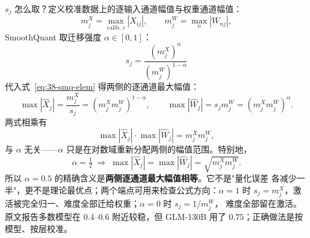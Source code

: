 $s_j$ 怎么取？定义校准数据上的逐输入通道幅值与权重通道幅值：
\begin{equation}
  m_j^X=\max_{\text{calib},\,i}|X_{ij}|,\qquad
  m_j^W=\max_{n}|W_{nj}|,
  \label{eq:38-mj}
\end{equation}
SmoothQuant 取迁移强度 $\alpha\in[0,1]$：
\begin{equation}
  \boxed{\,s_j=\frac{(m_j^X)^{\alpha}}{(m_j^W)^{1-\alpha}}\,}
  \label{eq:38-alpha}
\end{equation}
代入式~\ref{eq:38-smq-elem} 得两侧的逐通道最大幅值：
\begin{equation}
  \max|\widehat X_j|=\frac{m_j^X}{s_j}=(m_j^Xm_j^W)^{1-\alpha},\qquad
  \max|\widehat W_j|=s_jm_j^W=(m_j^Xm_j^W)^{\alpha}.
  \label{eq:38-split}
\end{equation}
两式相乘有
\begin{equation}
  \max|\widehat X_j|\cdot\max|\widehat W_j|=m_j^Xm_j^W,
  \label{eq:38-product}
\end{equation}
与 $\alpha$ 无关——$\alpha$ 只是在对数域重新分配两侧的幅值范围。特别地，
\begin{equation}
  \alpha=\tfrac12
  \;\Longrightarrow\;
  \max|\widehat X_j|=\max|\widehat W_j|=\sqrt{m_j^Xm_j^W}.
  \label{eq:38-half}
\end{equation}
所以 $\alpha=0.5$ 的精确含义是\textbf{两侧逐通道最大幅值相等}。它不是"量化误差
各减少一半"，更不是理论最优点；两个端点可用来检查公式方向：$\alpha=1$ 时
$s_j=m_j^X$，激活被完全归一、难度全部迁给权重；$\alpha=0$ 时 $s_j=1/m_j^W$，
难度全部留在激活。原文报告多数模型在 $0.4$--$0.6$ 附近较稳，但 GLM-130B 用了
$0.75$；正确做法是按模型、按层校准。

